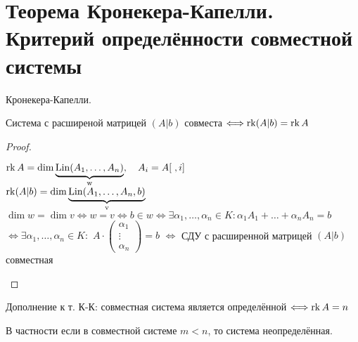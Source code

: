 
\section{Теорема Кронекера-Капелли. Критерий определённости совместной системы}

\begin{theorem}
    Кронекера-Капелли.

    Система с расширеной матрицей $(A|b)$ совместа
    $\Longleftrightarrow \operatorname{rk} (A|b) = \operatorname{rk} A$

    \begin{proof}
        \begin{center}
            $\operatorname{rk} A = \dim \underbrace{\operatorname{Lin}(A_1, \dots, A_n)}_{\text{w}}, \quad A_i = A[ \; , i]$ \\
            $\operatorname{rk} (A | b) = \dim \underbrace{\operatorname{Lin}(A_1, \dots, A_n, b)}_{\text{v}}$ \\
            $\dim w = \dim v \Longleftrightarrow w = v \Longleftrightarrow b \in w
            \Longleftrightarrow \exists \alpha_1, \dots, \alpha_n \in K:
            \alpha_1 A_1 + \dots + \alpha_n A_n = b$ \\
            $\Longleftrightarrow \exists \alpha_1, \dots, \alpha_n \in K:$ 
            $A \cdot \begin{pmatrix}
                \alpha_1 \\
                \vdots \\
                \alpha_n
            \end{pmatrix} = b$ $\Longleftrightarrow$ СДУ с расширенной матрицей $(A | b)$ совместная
        \end{center}    
    \end{proof}
\end{theorem}

\notice Дополнение к т. К-К: совместная система является определённой $\Longleftrightarrow \operatorname{rk} A = n$ 

В частности если в совместной системе $m < n$, то система неопределённая.